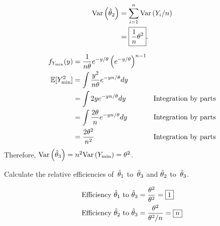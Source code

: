 \begin{align}
  \text{Var}\left(\hat{\theta}_{2}\right) &= \sum_{i=1}^{n} \text{Var}\left(Y_i /n\right) \\
                  &= \boxed{\frac{1}{n}\theta^{2}}\text{.}
\end{align}

\begin{align}
  f_{Y_{\min}}(y) &= \frac{1}{n\theta}e^{-y/\theta}\left(e^{-y/\theta}\right)^{n-1} \\
  \mathbb{E}\lbrack Y_{\min}^2\rbrack &= \int \frac{y^2}{n\theta} e^{-yn/\theta} dy \\
                    &= \int 2y e^{-yn/\theta} dy & \text{Integration by parts} \\
                    &= \int \frac{2\theta}{n} e^{-yn/\theta} dy & \text{Integration by parts} \\
                    &=  \frac{2\theta^{2}}{n^{2}} & \text{Integration by parts}
\end{align}
Therefore, ${\text{Var}\left(\hat{\theta}_{3}\right) = n^2 \text{Var}\left(Y_{\min}\right) = \theta^2}$.

\begin{subproblem}
  Calculate the relative efficiencies of~$\hat{\theta}_{1}$ to~$\hat{\theta}_{3}$ and $\hat{\theta}_{2}$ to~$\hat{\theta}_{3}$.
\end{subproblem}

\begin{align}
  \text{Efficiency }\hat{\theta}_{1} \text{ to }\hat{\theta}_{3} &= \frac{\theta^2}{\theta^2} = \boxed{1} \\
  \text{Efficiency }\hat{\theta}_{2} \text{ to }\hat{\theta}_{3} &= \frac{\theta^2}{\theta^2 /n} = \boxed{n}
\end{align}
